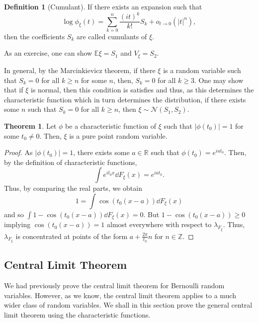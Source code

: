 \documentclass[]{article}
\theoremstyle{definition}
\newtheorem{theorem}{Theorem}
\theoremstyle{definition}
\newtheorem{definition}{Definition}[section]
\begin{document}
\begin{definition}[Cumulant]
  If there exists an expansion such that
  \[\log \phi_\xi(t) = \sum_{k = 0}^n \frac{(it)^k}{k!}S_k + o_{t \to 0}(|t|^n),\]
  then the coefficients \(S_k\) are called cumulants of \(\xi\).
\end{definition}

As an exercise, one can show \(\mathbb{E}\xi = S_1\) and \(V_\xi = S_2\).

In general, by the Marcinkievicz theorem, if there \(\xi\) is a random variable 
such that \(S_k = 0\) for all \(k \ge n\) for some \(n\), then, \(S_k = 0\) 
for all \(k \ge 3\). One may show that if \(\xi\) is normal, then this condition 
is satisfies and thus, as this determines the characteristic function which 
in turn determines the distribution, if there exists some \(n\) such that 
\(S_k = 0\) for all \(k \ge n\), then \(\xi \sim \mathcal{N}(S_1, S_2)\).

\begin{theorem}
  Let \(\phi\) be a characteristic function of \(\xi\) such that \(|\phi(t_0)| = 1\) 
  for some \(t_0 \neq 0\). Then, \(\xi\) is a pure point random variable. 
\end{theorem}
\begin{proof}
  As \(|\phi(t_0)| = 1\), there exists some \(a \in \mathbb{R}\) such that 
  \(\phi(t_0) =  e^{iat_0}\). Then, by the definition of characteristic functions, 
  \[\int e^{it_0x} \dd F_\xi(x) = e^{iat_0}.\]
  Thus, by comparing the real parts, we obtain 
  \[1 = \int \cos(t_0(x - a)) \dd F_\xi(x)\]
  and so \(\int 1 - \cos(t_0(x - a)) \dd F_\xi(x) = 0\). But 
  \(1 - \cos(t_0(x - a)) \ge 0\) implying \(\cos(t_0(x - a)) = 1\) almost everywhere 
  with respect to \(\lambda_{F_\xi}\). Thus, \(\lambda_{F_\xi}\) is concentrated 
  at points of the form \(a + \frac{2\pi}{t_0}n\) for \(n \in \mathbb{Z}\).
\end{proof}

\subsection{Central Limit Theorem}

We had previously prove the central limit theorem for Bernoulli random variables. 
However, as we know, the central limit theorem applies to a much wider class of 
random variables. We shall in this section prove the general central limit theorem 
using the characteristic functions.
\end{document}
